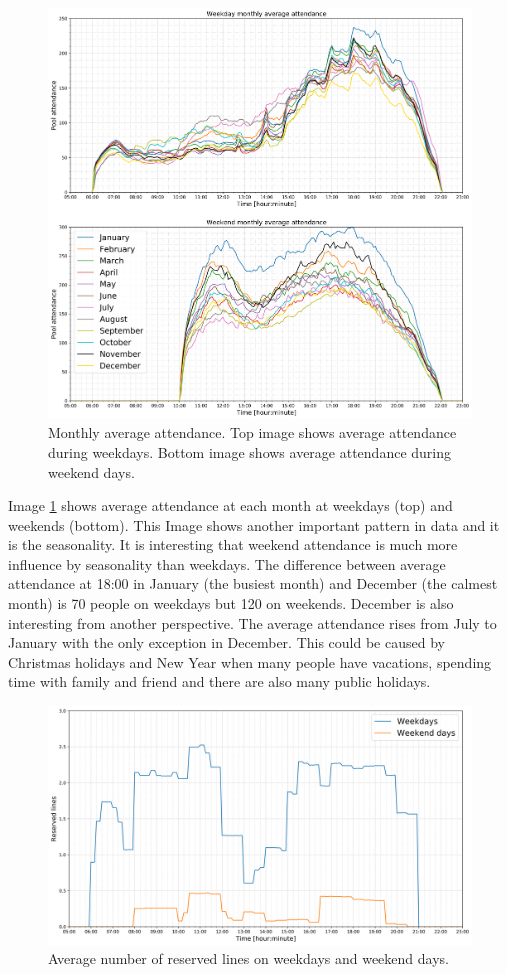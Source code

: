 \documentclass{article}
\begin{document}
\begin{figure}[H]
\centering
\includegraphics[width=13cm]{imgs/monthly_averages_together.png}
\caption{Monthly average attendance. Top image shows average attendance during weekdays. Bottom image shows average attendance during weekend days.}
\label{fig:monthly_averages}
\end{figure}

Image \ref{fig:monthly_averages} shows average attendance at each month at weekdays (top) and weekends (bottom). This Image shows another important pattern in data and it is the seasonality. It is interesting that weekend attendance is much more influence by seasonality than weekdays. The difference between average attendance at 18:00 in January (the busiest month) and December (the calmest month) is 70 people on weekdays but 120 on weekends. December is also interesting from another perspective. The average attendance rises from July to January with the only exception in December. This could be caused by Christmas holidays and New Year when many people have vacations, spending time with family and friend and there are also many public holidays. 

\begin{figure}[H]
\centering
\includegraphics[width=13cm]{imgs/avg_lines.png}
\caption{Average number of reserved lines on weekdays and weekend days.}
\label{fig:lines_averages}
\end{figure}
\end{document}
